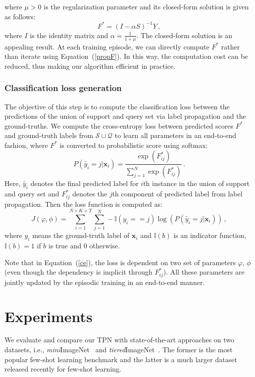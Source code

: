 \documentclass{article} \usepackage{iclr2019_conference,times}
\def\mini{{\textit{mini}ImageNet}}
\def\tiered{{\textit{tiered}ImageNet}}
\def\bfx{\mathbf{x}}
\begin{document}
where $\mu>0$ is the regularization parameter and its closed-form solution is given as follows:
\begin{equation}
	F^* = (I-\alpha S)^{-1}Y\,,
\end{equation}
where $I$ is the identity matrix and $\alpha=\frac{1}{1+\mu}$. The closed-form solution is an appealing result. At each training episode, we can directly compute $F^*$ rather than iterate using Equation~(\ref{propF}). In this way, the computation cost can be reduced, thus making our algorithm efficient in practice.
\fi

\subsubsection{Classification loss generation}
\label{loss}
The objective of this step is to compute the classification loss between the predictions of the union of support and query set via label propagation and the ground-truths.
We compute the cross-entropy loss between predicted scores $F^*$ and
ground-truth labels from $\mathcal{S}\cup \mathcal{Q}$ to learn all parameters in an end-to-end fashion, where $F^*$ is converted to probabilistic score using softmax:
\begin{equation}
	P(\tilde{y_i}=j|\bfx_i) = \frac{\exp(F^*_{ij})}{\sum_{j=1}^N \exp(F^*_{ij})}\,.
\end{equation}
Here, $\tilde{y_i}$ denotes the final predicted label for $i$th instance in the union of support and query set
and $F_{ij}^*$ denotes the $j$th component of predicted label from label propagation.
Then the loss function is computed as:
\begin{equation}
\label{ce}
	J(\varphi,\phi) = \sum_{i=1}^{N\times K+T}\sum_{j=1}^N-\mathbb{I}(y_i==j) \log(P(\tilde{y_i}=j|\bfx_i))\,,
\end{equation}
where $y_i$ means the ground-truth label of $\bfx_i$ and $\mathbb{I}(b)$ is an indicator function, $\mathbb{I}(b)=1$ if $b$ is true and $0$ otherwise.

Note that in Equation~(\ref{ce}), the loss is dependent on two set of parameters $\varphi$, $\phi$ (even though the dependency is implicit through $F^*_{ij}$). All these parameters are jointly updated by the episodic training in an end-to-end manner. 



\section{Experiments}
We evaluate and compare our TPN with state-of-the-art approaches on two datasets, i.e., \mini~\citep{metaLSTM} and \tiered~\citep{semi-proto}. The former is the most popular few-shot learning benchmark and the latter is a  much larger dataset released recently for few-shot learning. 
\end{document}
